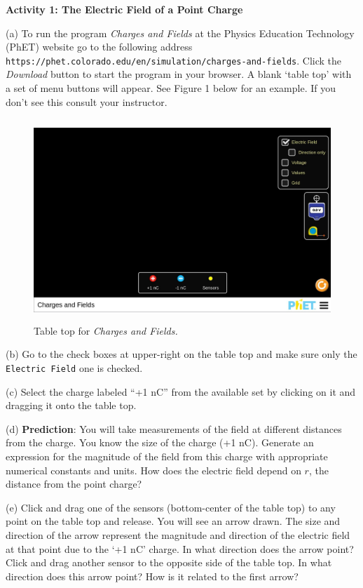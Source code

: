 \textbf{Activity 1: The Electric Field of a Point Charge}

(a) To run the program {\it Charges and Fields} at the Physics Education Technology (PhET)
website go to the following address {\tt https://phet.colorado.edu/en/simulation/charges-and-fields}.
Click the {\it Download} button to start the program in your browser.
A blank `table top' with a set of menu 
buttons will appear. See Figure 1 below for an example.
If you don't see this consult your instructor.

\begin{figure}[hbt]
\begin{center}
\includegraphics[height=3.0in]{chargesFields1/chargesFieldFig1.pdf}
\caption{Table top for {\it Charges and Fields.}}
\end{center}
\end{figure}

(b) Go to the check boxes at upper-right on the table top and make sure only the {\tt Electric Field}
one is checked.

(c) Select the charge labeled {}``+1 nC'' from the available set by clicking
on it and dragging it onto the table top. 

(d) \textbf{Prediction}: You will take measurements of the field at different
distances from the charge. You know the size of the
charge (+1 nC).
Generate an expression for the magnitude of the field from this charge
with appropriate numerical constants and units.
How does the electric field depend on $r$, the distance from the point charge?
\newpage

\vspace{-30mm}

(e) Click and drag one of the sensors (bottom-center of the table top)
to any point on the table top and release. You will see an arrow drawn.
The size and direction of the arrow represent the magnitude and direction of
the electric field at that point due to the `+1 nC' charge.
In what direction does the arrow point?
Click and drag another sensor to the opposite side of the table top.
In what direction does this arrow point? How is it related to the first arrow?
\vspace{15mm}

